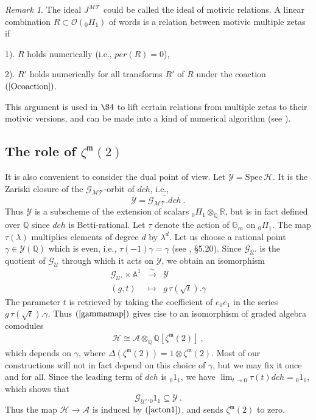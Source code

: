 \documentclass[10pt]{amsart}
\theoremstyle{definition}
\theoremstyle{remark}
\newtheorem{rem}[thm]{Remark}
\numberwithin{equation}{section}
\newcommand{\R}{\mathbb R}
\newcommand{\Ho}{\mathcal{H}}
\newcommand{\MT}{\mathcal{MT}}
\newcommand{\GMT}{\mathcal{G_{MT}}}
\newcommand{\G}{\mathbb{G}}
\newcommand{\GU}{\mathcal{G}_{\mathcal{U}}}
\newcommand{\GPU}{\mathcal{G_{\mathcal{U'}}}}
\newcommand{\Ao}{\mathcal{A}}
\newcommand{\tp}{{}_0 1_{1}}
\newcommand{\pio}{{}_0 \Pi_{1}}
\newcommand{\dch}{dch}
\newcommand{\Jmt}{J^{\MT} }
\newcommand{\ZZ}{\mathcal{Y}}
\newcommand{\zetam}{\zeta^{ \mathfrak{m}}}
\newcommand{\Q}{\mathbb Q}
\newcommand{\To}{\longrightarrow}
\newcommand{\A}{\mathbb{A}}
\begin{document}
\begin{rem} The ideal $\Jmt$ could be  called  the ideal of motivic relations. A linear combination  $R\subset \mathcal{O}(\pio)$ of words is a relation between  motivic multiple zetas  if 

1). $R$ holds numerically (i.e.,  $per (R)=0$), 

2). $R'$ holds numerically for all  transforms $R'$ of $R$ under the coaction $(\ref{Ocoaction})$.


\noindent 
This argument is used in $\S 4$ to lift certain relations from multiple zetas to their motivic versions, and can be made into a kind of numerical algorithm   (see \cite{Br}). 
\end{rem}

\subsection{The role of $\zetam(2)$}  It is also convenient to consider the dual point of view. Let $\ZZ=\mathrm{Spec} \, \Ho$. It is the Zariski closure of the $\GMT$-orbit of $\dch$, 
 i.e., 
$$\ZZ = \overline{\GMT .dch }\ .$$
Thus $\ZZ$ is a subscheme of the extension of scalars  $\pio\otimes_{\Q}\R$, but is in fact defined over $\Q$ since $dch$ is Betti-rational.  
Let $\tau$ denote the action of $\G_m$ on $\pio$. The map $\tau(\lambda)$  multiplies elements of degree $d$ by $\lambda^d$.
 Let us choose a rational point  $\gamma \in \ZZ(\Q)$ which is  even, i.e., $\tau(-1)\gamma=\gamma$ (see \cite{DG}, \S5.20). 
 Since    $\GPU$ is the quotient of $\GU$ through which it acts on $\ZZ$, we obtain an isomorphism 
\begin{eqnarray} \label{gammamap}
\GPU \times \A^1 &\overset{\sim}{\To} & \ZZ  \\ 
(g,t) & \mapsto & g \, \tau({\sqrt{t}}) . \gamma  \nonumber 
\end{eqnarray}
The  parameter $t$  is retrieved  by taking the coefficient of $e_0 e_1$ in the series $g \, \tau({\sqrt{t}}).\gamma$. Thus $(\ref{gammamap})$ gives rise to  an  isomorphism of graded algebra comodules
\begin{eqnarray} \label{Hotens}
\Ho \cong \Ao \otimes_{\Q}\Q [\zetam(2)] \ ,
\end{eqnarray}
which depends on $\gamma$, where $\Delta(\zetam(2))= 1 \otimes \zetam(2)$. Most of our constructions will not in fact depend on this choice of $\gamma$, but we may fix it once  and for all. 
Since the leading term of $dch$ is $\tp$, we have  $\lim_{t \rightarrow 0} \tau(t) \dch = \tp$, which shows that 
$$ \GPU.\tp  \subseteq \ZZ\ . $$
Thus the map  $\Ho \rightarrow \Ao$ is induced by 
$(\ref{acton1})$, and sends $\zetam(2)$ to zero.
\end{document}
